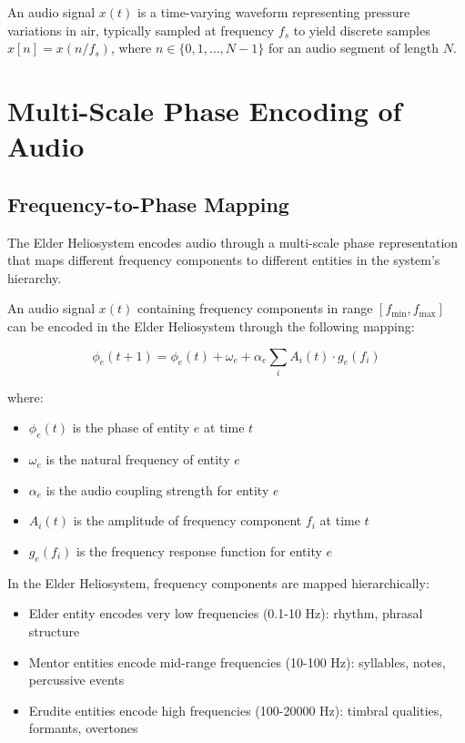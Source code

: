 \begin{definition}
An audio signal $x(t)$ is a time-varying waveform representing pressure variations in air, typically sampled at frequency $f_s$ to yield discrete samples $x[n] = x(n/f_s)$, where $n \in \{0,1,\ldots,N-1\}$ for an audio segment of length $N$.
\end{definition}

\section{Multi-Scale Phase Encoding of Audio}

\subsection{Frequency-to-Phase Mapping}

The Elder Heliosystem encodes audio through a multi-scale phase representation that maps different frequency components to different entities in the system's hierarchy.

\begin{theorem}
An audio signal $x(t)$ containing frequency components in range $[f_{\min}, f_{\max}]$ can be encoded in the Elder Heliosystem through the following mapping:

\begin{equation}
\phi_e(t+1) = \phi_e(t) + \omega_e + \alpha_e \sum_{i} A_i(t) \cdot g_e(f_i)
\end{equation}

where:
\begin{itemize}
    \item $\phi_e(t)$ is the phase of entity $e$ at time $t$
    \item $\omega_e$ is the natural frequency of entity $e$
    \item $\alpha_e$ is the audio coupling strength for entity $e$
    \item $A_i(t)$ is the amplitude of frequency component $f_i$ at time $t$
    \item $g_e(f_i)$ is the frequency response function for entity $e$
\end{itemize}
\end{theorem}

\begin{corollary}
In the Elder Heliosystem, frequency components are mapped hierarchically:
\begin{itemize}
    \item Elder entity encodes very low frequencies (0.1-10 Hz): rhythm, phrasal structure
    \item Mentor entities encode mid-range frequencies (10-100 Hz): syllables, notes, percussive events
    \item Erudite entities encode high frequencies (100-20000 Hz): timbral qualities, formants, overtones
\end{itemize}
\end{corollary}

